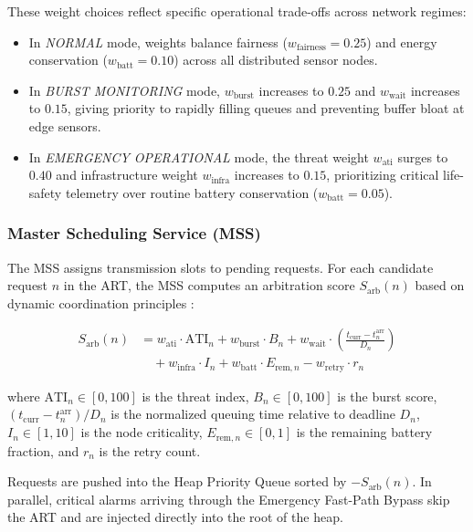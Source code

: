 \documentclass[preprint,review,12pt]{elsarticle}
\begin{document}
These weight choices reflect specific operational trade-offs across network regimes:
\begin{itemize}
    \item In \textit{NORMAL} mode, weights balance fairness ($w_{\text{fairness}} = 0.25$) and energy conservation ($w_{\text{batt}} = 0.10$) across all distributed sensor nodes.
    \item In \textit{BURST MONITORING} mode, $w_{\text{burst}}$ increases to $0.25$ and $w_{\text{wait}}$ increases to $0.15$, giving priority to rapidly filling queues and preventing buffer bloat at edge sensors.
    \item In \textit{EMERGENCY OPERATIONAL} mode, the threat weight $w_{\text{ati}}$ surges to $0.40$ and infrastructure weight $w_{\text{infra}}$ increases to $0.15$, prioritizing critical life-safety telemetry over routine battery conservation ($w_{\text{batt}} = 0.05$).
\end{itemize}

\subsubsection{Master Scheduling Service (MSS)}

The MSS assigns transmission slots to pending requests. For each candidate request $n$ in the ART, the MSS computes an arbitration score $S_{\text{arb}}(n)$ based on dynamic coordination principles \cite{lu2026dynamic}:

\begin{align}
\label{eq:arbitration_score}
S_{\text{arb}}(n) &= w_{\text{ati}} \cdot \text{ATI}_n + w_{\text{burst}} \cdot B_n + w_{\text{wait}} \cdot \left(\frac{t_{\text{curr}} - t_n^{\text{arr}}}{D_n}\right) \nonumber \\
&\quad + w_{\text{infra}} \cdot I_n + w_{\text{batt}} \cdot E_{\text{rem}, n} - w_{\text{retry}} \cdot r_n
\end{align}

where $\text{ATI}_n \in [0, 100]$ is the threat index, $B_n \in [0, 100]$ is the burst score, $(t_{\text{curr}} - t_n^{\text{arr}})/D_n$ is the normalized queuing time relative to deadline $D_n$, $I_n \in [1, 10]$ is the node criticality, $E_{\text{rem}, n} \in [0, 1]$ is the remaining battery fraction, and $r_n$ is the retry count.

Requests are pushed into the Heap Priority Queue sorted by $-S_{\text{arb}}(n)$. In parallel, critical alarms arriving through the Emergency Fast-Path Bypass skip the ART and are injected directly into the root of the heap. 
\end{document}
